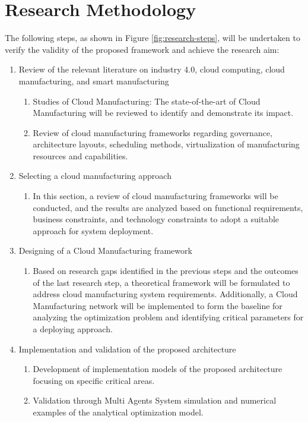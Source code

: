 \section{Research Methodology}
The following steps, as shown in Figure \ref{fig:research-steps}, will be undertaken to verify the validity of the proposed framework and achieve the research aim:
\begin{enumerate}
    \item Review of the relevant literature on industry 4.0, cloud computing, cloud manufacturing, and smart manufacturing
    \begin{enumerate}
        \item Studies of Cloud Manufacturing: The state-of-the-art of Cloud Manufacturing will be reviewed to identify and demonstrate its impact.
        \item Review of cloud manufacturing frameworks regarding governance, architecture layouts, scheduling methods, virtualization of manufacturing resources and capabilities.
    \end{enumerate}
    \item Selecting a cloud manufacturing approach
    \begin{enumerate}
        \item In this section, a review of cloud manufacturing frameworks will be conducted, and the results are analyzed based on functional requirements, business constraints, and technology constraints to adopt a suitable approach for system deployment.
    \end{enumerate}
    \item Designing of a Cloud Manufacturing framework
    \begin{enumerate}
        \item Based on research gaps identified in the previous steps and the
outcomes of the last research step, a theoretical framework will be formulated to address cloud manufacturing system requirements. Additionally, a Cloud Manufacturing network will be implemented to form the baseline for analyzing the optimization problem and identifying critical parameters for a deploying approach.
    \end{enumerate}
    \item Implementation and validation of the proposed architecture
    \begin{enumerate}
        \item Development of implementation models of the proposed architecture focusing on specific critical areas.
        \item Validation through Multi Agents System simulation and numerical examples of the analytical optimization model.
    \end{enumerate}
\end{enumerate}

